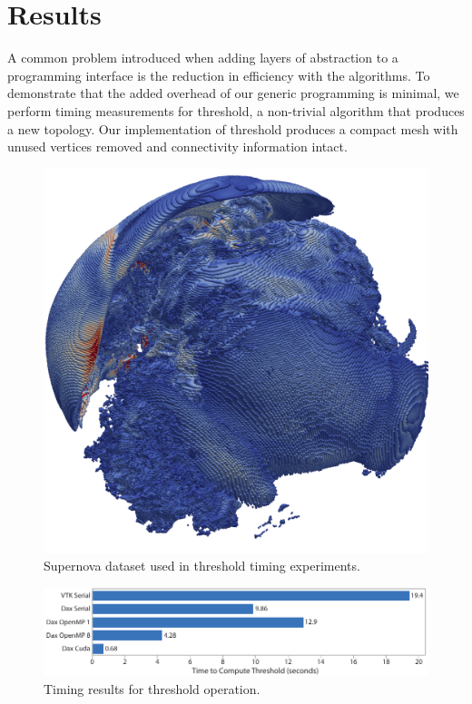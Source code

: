 \documentclass[conference]{IEEEtran}
\begin{document}
\section{Results}

\noindent
A common problem introduced when adding layers of abstraction to a
programming interface is the reduction in efficiency with the algorithms.
To demonstrate that the added overhead of our generic programming is
minimal, we perform timing measurements for threshold, a non-trivial
algorithm that produces a new topology.  Our implementation of threshold
produces a compact mesh with unused vertices removed and connectivity
information intact.

\begin{figure}[ht]
  \centering
  \includegraphics[width=\linewidth]{images/SupernovaThreshold}
  \caption{Supernova dataset used in threshold timing experiments.}
  \label{fig:Supernova}
\end{figure}

\begin{figure}
  \centering
  \includegraphics[width=\linewidth]{images/ThresholdTiming}
  \caption{Timing results for threshold operation.}
  \label{fig:Timing}
\end{figure}
\end{document}
